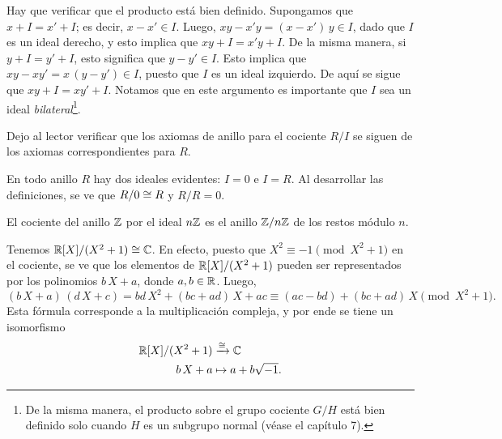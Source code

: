 Hay que verificar que el producto está bien definido. Supongamos que
$x + I = x' + I$; es decir, $x - x' \in I$. Luego,
$x y - x'y = (x-x')\,y \in I$, dado que $I$ es un ideal derecho, y esto implica
que $xy + I = x'y + I$. De la misma manera, si $y + I = y' + I$, esto significa
que $y - y' \in I$. Esto implica que $x y - xy' = x\,(y-y') \in I$, puesto que
$I$ es un ideal izquierdo. De aquí se sigue que $xy + I = xy' + I$. Notamos que
en este argumento es importante que $I$ sea un ideal
\emph{bilateral}\footnote{De la misma manera, el producto sobre el grupo
  cociente $G/H$ está bien definido solo cuando $H$ es un subgrupo normal (véase
  el capítulo 7).}.

Dejo al lector verificar que los axiomas de anillo para el cociente $R/I$
se siguen de los axiomas correspondientes para $R$.

\begin{ejemplo}
  En todo anillo $R$ hay dos ideales evidentes: $I = 0$ e $I = R$.
  Al desarrollar las definiciones, se ve que $R/0 \cong R$ y $R/R = 0$.
\end{ejemplo}

\begin{ejemplo}
  El cociente del anillo $\mathbb{Z}$ por el ideal $n\mathbb{Z}$ es el anillo $\mathbb{Z}/n\mathbb{Z}$
  de los restos módulo $n$.
\end{ejemplo}

\begin{ejemplo}
  Tenemos $\mathbb{R} [X]/(X^2 + 1) \cong \mathbb{C}$. En efecto, puesto que
  $X^2 \equiv -1 \pmod{X^2 + 1}$ en el cociente, se ve que los elementos
  de $\mathbb{R} [X]/(X^2 + 1)$ pueden ser representados por los polinomios $b\,X + a$,
  donde $a,b\in \mathbb{R}$. Luego,
  \[ (b\,X + a)\,(d\,X + c) =
    bd\,X^2 + (bc + ad)\,X + ac \equiv (ac-bd) + (bc+ad)\,X \pmod{X^2 + 1}. \]
  Esta fórmula corresponde a la multiplicación compleja, y por ende se tiene
  un isomorfismo
  \begin{align*}
    \mathbb{R} [X]/(X^2 + 1) & \xrightarrow{\cong} \mathbb{C}\\
    b\,X + a & \mapsto a + b\sqrt{-1}.
  \end{align*}
\end{ejemplo}

